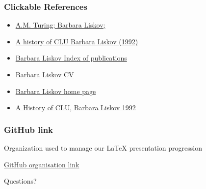 \documentclass{beamer}
\begin{document}
\begin{frame}
\frametitle{Clickable References}
\begin{itemize}
\item \href{https://amturing.acm.org/award_winners/liskov_1108679.cfm}{ A.M. Turing; Barbara Liskov;} 

\item \href {https://dl.acm.org/doi/abs/10.1145/155360.155367}{A history of CLU Barbara Liskov (1992)}

\item \href{https://dblp.uni-trier.de/pid/l/BarbaraLiskov.html}{Barbara Liskov Index of publications}

\item \href{http://www.pmg.csail.mit.edu/~liskov/newcv-09.pdf}{Barbara Liskov CV}

\item \href{http://www.pmg.csail.mit.edu/~liskov/}{Barbara Liskov home page}

\item \href{https://citeseerx.ist.psu.edu/viewdoc/download?doi=10.1.1.46.9499&rep=rep1&type=pdf}{A History of CLU, Barbara Liskov 1992}
\end{itemize}
\end{frame}


\begin{frame}
\frametitle{GitHub link}

Organization used to manage our LaTeX presentation progression

\vspace{5mm}


\href{https://github.com/Research-Methods-Presentation}{GitHub organisation link} 

\end{frame}


\begin{frame}
\Huge{\centerline{Questions?}}
\end{frame}

\end{document}

